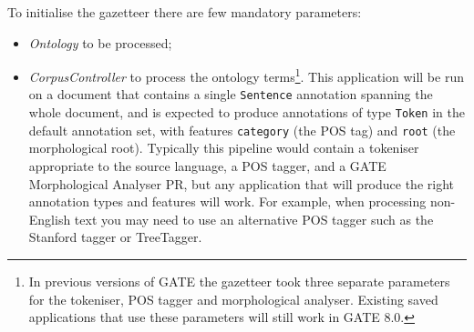 
To initialise the gazetteer there are few mandatory parameters:
\begin{itemize}
\item \emph{Ontology} to be processed;
\item \emph{CorpusController} to process the ontology terms\footnote{In
  previous versions of GATE the gazetteer took three separate parameters for
  the tokeniser, POS tagger and morphological analyser.  Existing saved
  applications that use these parameters will still work in GATE 8.0.}.  This
  application will be run on a document that contains a single \verb!Sentence!
  annotation spanning the whole document, and is expected to produce
  annotations of type \verb!Token! in the default annotation set, with features
  \verb!category!  (the POS tag) and \verb!root! (the morphological root).
  Typically this pipeline would contain a tokeniser appropriate to the source
  language, a POS tagger, and a GATE Morphological Analyser PR, but any
  application that will produce the right annotation types and features will
  work.  For example, when processing non-English text you may need to use an
  alternative POS tagger such as the Stanford tagger or TreeTagger.
\end{itemize}

